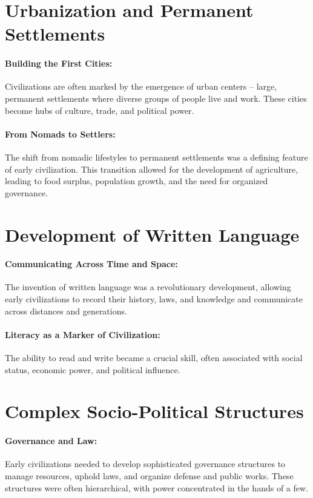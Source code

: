 \documentclass{book}
\begin{document}
\section*{Urbanization and Permanent Settlements}

\paragraph{Building the First Cities:}
Civilizations are often marked by the emergence of urban centers – large, permanent settlements where diverse groups of people live and work. These cities become hubs of culture, trade, and political power.

\paragraph{From Nomads to Settlers:}
The shift from nomadic lifestyles to permanent settlements was a defining feature of early civilization. This transition allowed for the development of agriculture, leading to food surplus, population growth, and the need for organized governance.

\section*{Development of Written Language}

\paragraph{Communicating Across Time and Space:}
The invention of written language was a revolutionary development, allowing early civilizations to record their history, laws, and knowledge and communicate across distances and generations.

\paragraph{Literacy as a Marker of Civilization:}
The ability to read and write became a crucial skill, often associated with social status, economic power, and political influence.

\section*{Complex Socio-Political Structures}

\paragraph{Governance and Law:}
Early civilizations needed to develop sophisticated governance structures to manage resources, uphold laws, and organize defense and public works. These structures were often hierarchical, with power concentrated in the hands of a few.
\end{document}
